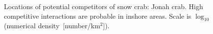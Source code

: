 \documentclass[11pt]{article}
\newcommand*{\D}{.}  %
\newcommand{\sq}{$^2$}
\newcommand{\kmsq}{km\sq}
\begin{document}
\begin{figure}[ht]
\begin{center}
\end{center}
\caption{Locations of potential competitors of snow crab: Jonah crab. High competitive interactions are probable in inshore areas. Scale is $\log_{10}$ (numerical density~[number/\kmsq]).}
\label{fig:othercrabs.jonahcrab}
\end{figure}


\clearpage \newpage
\end{document}
